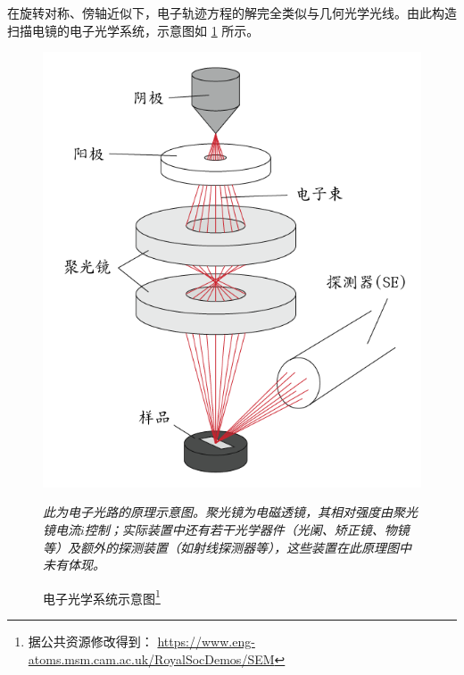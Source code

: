 \documentclass[aps,pre,12pt,preprint,%
	onecolumn,showpacs,showkeys,nofootinbib]{revtex4-1}
\begin{document}
	在旋转对称、傍轴近似下，电子轨迹方程的解完全类似与几何光学光线。由此构造扫描电镜的电子光学系统，示意图如 \ref{fig:semScheme} 所示。
	
	\begin{figure}[!h]
	\vspace{.8ex}
	\includegraphics[width=.6\linewidth]{SEMscheme.png}
	\caption[电子光学示意图]{电子光学系统示意图\footnote{%
		据公共资源修改得到：
		\url{https://www.eng-atoms.msm.cam.ac.uk/RoyalSocDemos/SEM}
	}}\vspace{1ex}
	\raggedright\small
	\textit{\hphantom{说明}%
		此为电子光路的原理示意图。聚光镜为电磁透镜，其相对强度由聚光镜电流$i$控制；实际装置中还有若干光学器件（光阑、矫正镜、物镜等）及额外的探测装置（如射线探测器等），这些装置在此原理图中未有体现。
	\vspace{1ex}}
	\label{fig:semScheme}
	\end{figure}
	
\end{document}
